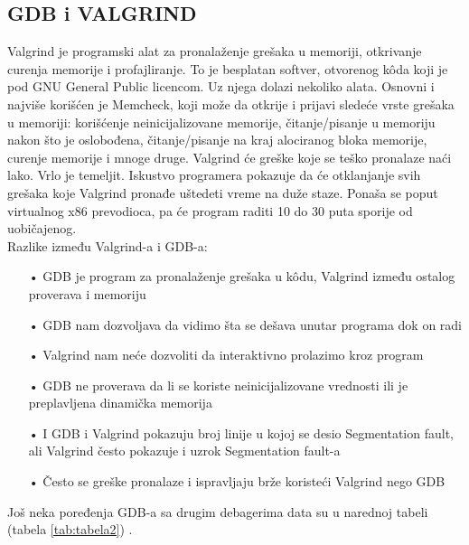 \documentclass[a4paper]{article}
\begin{document}
\subsection{GDB i VALGRIND}
\label{subsec:valgrind}
Valgrind je programski alat za pronalaženje grešaka u memoriji, otkrivanje curenja memorije i 
profajliranje. To je besplatan softver, otvorenog k\^{o}da koji je pod GNU General Public licencom. 
Uz njega dolazi nekoliko alata. Osnovni i najviše korišćen je Memcheck, koji može da otkrije i  
prijavi sledeće vrste grešaka u memoriji: korišćenje neinicijalizovane memorije, čitanje/pisanje u 
memoriju nakon što je oslobođena, čitanje/pisanje na kraj alociranog bloka memorije, 
curenje memorije i  mnoge druge. Valgrind će greške koje se teško pronalaze naći lako. Vrlo je 
temeljit. Iskustvo programera pokazuje da će otklanjanje svih grešaka koje Valgrind pronađe 
uštedeti vreme na duže staze. Ponaša se poput virtualnog x86 prevodioca, pa će program raditi 10 
do 30 puta sporije od uobičajenog\cite{valgrind}.\\

Razlike između Valgrind-a i GDB-a\cite{valgrind}:
\begin{enumerate}
\item[•]GDB je program za pronalaženje grešaka u k\^{o}du, Valgrind između ostalog proverava i memoriju
\item[•]GDB nam dozvoljava da vidimo šta se dešava unutar programa dok on radi
\item[•]Valgrind nam neće dozvoliti da interaktivno prolazimo kroz program
\item[•]GDB ne proverava da li se koriste neinicijalizovane vrednosti ili je preplavljena dinamička memorija
\item[•]I GDB i Valgrind pokazuju broj linije u kojoj se desio Segmentation fault, ali Valgrind često pokazuje 
i uzrok Segmentation fault-a
\item[•]Često se greške pronalaze i ispravljaju brže koristeći Valgrind nego GDB
\end{enumerate}

Još neka poređenja GDB-a sa drugim debagerima data su u narednoj tabeli (tabela \ref{tab:tabela2}) \cite{poredjenje}.
\end{document}
